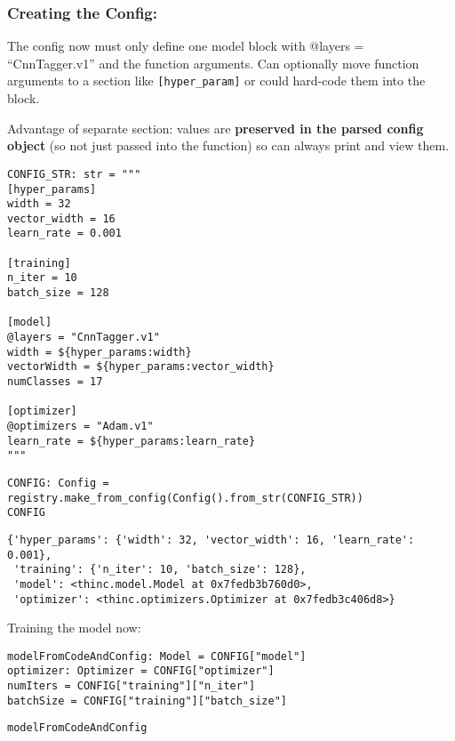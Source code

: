 \documentclass[
]{article}
\begin{document}
\hypertarget{creating-the-config}{%
\subsubsection{Creating the Config:}\label{creating-the-config}}

The config now must only define one model block with @layers =
``CnnTagger.v1'' and the function arguments. Can optionally move
function arguments to a section like
\texttt{[hyper_param]} or could hard-code them into the
block.

Advantage of separate section: values are \textbf{preserved in the
parsed config object} (so not just passed into the function) so can
always print and view them.

\begin{verbatim}
CONFIG_STR: str = """
[hyper_params]
width = 32
vector_width = 16
learn_rate = 0.001

[training]
n_iter = 10
batch_size = 128

[model]
@layers = "CnnTagger.v1"
width = ${hyper_params:width}
vectorWidth = ${hyper_params:vector_width}
numClasses = 17

[optimizer]
@optimizers = "Adam.v1"
learn_rate = ${hyper_params:learn_rate}
"""
\end{verbatim}

\begin{verbatim}
CONFIG: Config = registry.make_from_config(Config().from_str(CONFIG_STR))
CONFIG
\end{verbatim}

\begin{verbatim}
{'hyper_params': {'width': 32, 'vector_width': 16, 'learn_rate': 0.001},
 'training': {'n_iter': 10, 'batch_size': 128},
 'model': <thinc.model.Model at 0x7fedb3b760d0>,
 'optimizer': <thinc.optimizers.Optimizer at 0x7fedb3c406d8>}
\end{verbatim}

Training the model now:

\begin{verbatim}
modelFromCodeAndConfig: Model = CONFIG["model"]
optimizer: Optimizer = CONFIG["optimizer"]
numIters = CONFIG["training"]["n_iter"]
batchSize = CONFIG["training"]["batch_size"]
\end{verbatim}

\begin{verbatim}
modelFromCodeAndConfig
\end{verbatim}
\end{document}
